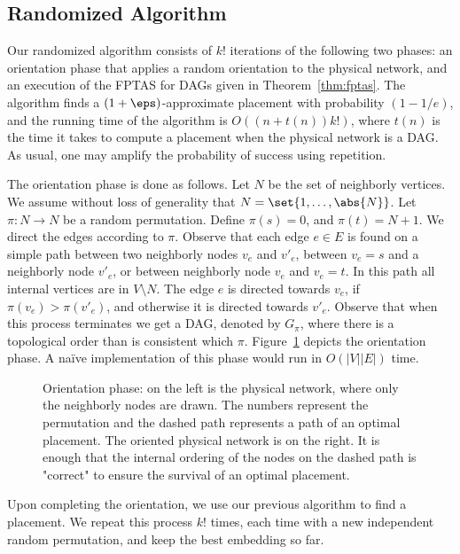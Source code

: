 
\subsection{Randomized Algorithm}

Our randomized algorithm consists of $k!$ iterations of the following
two phases: an orientation phase that applies a random orientation to
the physical network, and an execution of the FPTAS for DAGs given in
Theorem~\ref{thm:fptas}.  The algorithm finds a $(1+\eps)$-approximate
placement with probability $(1-1/e)$, and the running time of the
algorithm is $O((n+t(n))k!)$, where $t(n)$ is the time it takes to
compute a placement when the physical network is a DAG.
%
As usual, one may amplify the probability of success using repetition.

The orientation phase is done as follows.  Let $N$ be the set of
neighborly vertices.  We assume without loss of generality that $N =
\set{1,\ldots,\abs{N}}$.
%
Let $\pi:N \to N$ be a random permutation.  Define $\pi(s) = 0$, and
$\pi(t) = N+1$.  We direct the edges according to $\pi$.
%
Observe that each edge $e \in E$ is found on a simple path between two
neighborly nodes $v_e$ and $v'_e$, between $v_e = s$ and a neighborly
node $v'_e$, or between neighborly node $v_e$ and $v_e = t$.  In this
path all internal vertices are in $V \setminus N$.  The edge $e$ is
directed towards $v_e$, if $\pi(v_e) > \pi(v'_e)$, and otherwise it is
directed towards $v'_e$.
%
Observe that when this process terminates we get a DAG, denoted by
$G_\pi$, where there is a topological order than is consistent which
$\pi$.  Figure~\ref{fig:orientation} depicts the orientation phase.
%
A na\"ive implementation of this phase would run in $O(|V||E|)$ time.

\begin{figure}[t]
\centering
{}
\caption[\scp{} - Orientation phase]{Orientation phase: on the left is the physical network, where
  only the neighborly nodes are drawn.  The numbers represent the
  permutation and the dashed path represents a path of an optimal
  placement.  The oriented physical network is on the right.  It is
  enough that the internal ordering of the nodes on the dashed path is
  "correct" to ensure the survival of an optimal placement. }
\label{fig:orientation}
\end{figure}

Upon completing the orientation, we use our previous algorithm to find
a placement.  We repeat this process $k!$ times, each time with a new
independent random permutation, and keep the best embedding so far.

